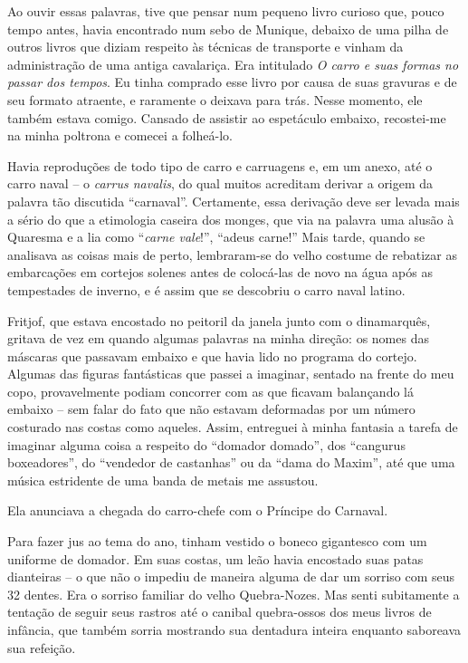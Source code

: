 Ao ouvir essas palavras, tive que pensar num pequeno livro curioso que,
pouco tempo antes, havia encontrado num sebo de Munique, debaixo de uma
pilha de outros livros que diziam respeito às técnicas de transporte e
vinham da administração de uma antiga cavalariça. Era intitulado \emph{O
carro e suas formas no passar dos tempos}. Eu tinha comprado esse livro
por causa de suas gravuras e de seu formato atraente, e raramente o
deixava para trás. Nesse momento, ele também estava comigo. Cansado de
assistir ao espetáculo embaixo, recostei-me na minha poltrona e comecei
a folheá-lo.

Havia reproduções de todo tipo de carro e carruagens e, em um anexo, até
o carro naval -- o \emph{carrus navalis}, do qual muitos acreditam
derivar a origem da palavra tão discutida ``carnaval''. Certamente, essa
derivação deve ser levada mais a sério do que a etimologia caseira dos
monges, que via na palavra uma alusão à Quaresma e a lia como
``\emph{carne vale}!'', ``adeus carne!'' Mais tarde, quando se analisava
as coisas mais de perto, lembraram-se do velho costume de rebatizar as
embarcações em cortejos solenes antes de colocá-las de novo na água após
as tempestades de inverno, e é assim que se descobriu o carro naval
latino.

Fritjof, que estava encostado no peitoril da janela junto com o
dinamarquês, gritava de vez em quando algumas palavras na minha direção:
os nomes das máscaras que passavam embaixo e que havia lido no programa
do cortejo. Algumas das figuras fantásticas que passei a imaginar,
sentado na frente do meu copo, provavelmente podiam concorrer com as que
ficavam balançando lá embaixo -- sem falar do fato que não estavam
deformadas por um número costurado nas costas como aqueles. Assim,
entreguei à minha fantasia a tarefa de imaginar alguma coisa a respeito
do ``domador domado'', dos ``cangurus boxeadores'', do ``vendedor de
castanhas'' ou da ``dama do Maxim'', até que uma música estridente de
uma banda de metais me assustou.

Ela anunciava a chegada do carro-chefe com o Príncipe do Carnaval.

Para fazer jus ao tema do ano, tinham vestido o boneco gigantesco com um
uniforme de domador. Em suas costas, um leão havia encostado suas patas
dianteiras -- o que não o impediu de maneira alguma de dar um sorriso
com seus 32 dentes. Era o sorriso familiar do velho Quebra-Nozes. Mas
senti subitamente a tentação de seguir seus rastros até o canibal
quebra-ossos dos meus livros de infância, que também sorria mostrando
sua dentadura inteira enquanto saboreava sua refeição.

